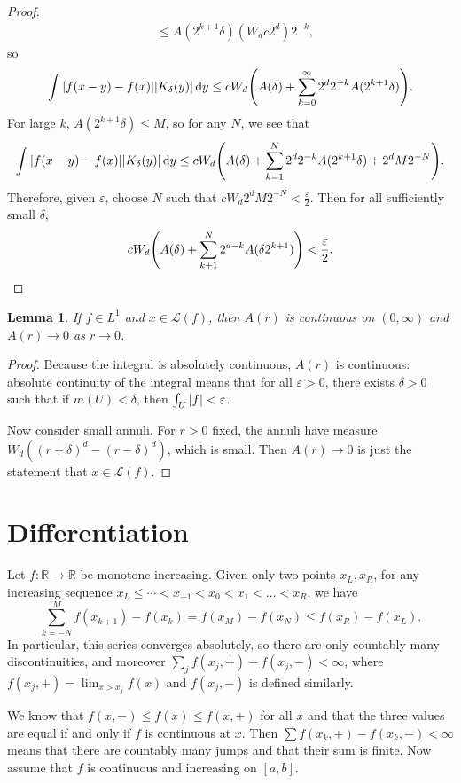 \documentclass[leqno, openany]{memoir}
\newtheorem{lem}[thm]{Lemma}
\theoremstyle{definition}
\theoremstyle{remark}
\theoremstyle{plain}
\theoremstyle{definition}
\theoremstyle{remark}
\newcommand{\R}{\mathbb{R}}
\newcommand{\ep}{\varepsilon}
\newcommand{\mc}[1]{\mathcal{#1}}
\begin{document}
\begin{proof}
\begin{align*}
                                                                                                        &\leq A(2^{k+1}\delta)(W_d c 2^d)2^{-k},
    \end{align*}
    so
    \[ \int \abs{f(x-y) - f(x)} \abs{K_{\delta}(y)} \dd{y} \leq c W_d \qty(A(\delta) + \sum_{k=0}^{\infty} 2^d 2^{-k}A(2^{k+1} \delta)). \]
    For large $k$, $A(2^{k+1}\delta) \leq M$, so for any $N$, we see that
    \[ \int \abs{f(x-y)-f(x)}\abs{K_{\delta}(y)} \dd{y} \leq cW_d \qty(A(\delta) + \sum_{k=1}^N 2^d 2^{-k} A(2^{k+1}\delta) + 2^dM2^{-N}). \]
    Therefore, given $\ep$, choose $N$ such that $c W_d 2^d M 2^{-N} < \frac{\ep}{2}$. Then for all sufficiently small $\delta$,
    \[ c W_d \qty(A(\delta) + \sum_{k+1}^N 2^{d-k}A(\delta 2^{k+1})) < \frac{\ep}{2}. \qedhere \]
\end{proof}

\begin{lem}
    If $f \in L^1$ and $x \in \mc{L}(f)$, then $A(r)$ is continuous on $(0, \infty)$ and $A(r) \to 0$ as $r \to 0$.
\end{lem}

\begin{proof}
    Because the integral is absolutely continuous, $A(r)$ is continuous: absolute continuity of the integral means that for all $\ep > 0$, there exists $\delta > 0$ such that if $m(U) < \delta$, then $\int_U \abs{f} < \ep$.

    Now consider small annuli. For $r > 0$ fixed, the annuli have measure $W_d ((r+\delta)^d - (r-\delta)^d)$, which is small. Then $A(r) \to 0$ is just the statement that $x \in \mc{L}(f)$.
\end{proof}

\section{Differentiation}%
\label{sec:differentiation}

Let $f: \R \to \R$ be monotone increasing. Given only two points $x_L, x_R$, for any increasing sequence $x_L \leq \cdots < x_{-1} < x_0 < x_1 < \ldots < x_R$, we have
\[ \sum_{k=-N}^M f(x_{k+1}) - f(x_k) = f(x_M) - f(x_N) \leq f(x_R) - f(x_L). \]
In particular, this series converges absolutely, so there are only countably many discontinuities, and moreover $\sum_j f(x_j,+) - f(x_j,-) < \infty$, where $f(x_j,+) = \lim_{x>x_j}f(x)$ and $f(x_j,-)$ is defined similarly.

We know that $f(x,-) \leq f(x) \leq f(x,+)$ for all $x$ and that the three values are equal if and only if $f$ is continuous at $x$. Then $\sum f(x_k,+) - f(x_k,-) < \infty$ means that there are countably many jumps and that their sum is finite. Now assume that $f$ is continuous and increasing on $[a,b]$. 
\end{document}
